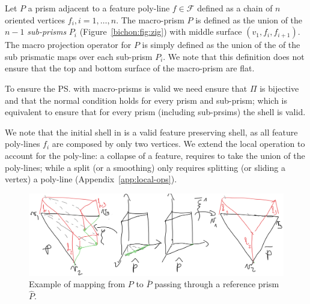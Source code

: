 Let $P$ a prism adjacent to a feature poly-line $f\in\mathcal{F}$ defined as a chain of $n$ oriented vertices $f_i, i=1,\dots,n$. The macro-prism $P$ is defined as the union of the $n-1$ \emph{sub-prisms} $P_i$ (Figure~\ref{bichon:fig:zig}) with middle surface $(v_1, f_i, f_{i+1})$. The macro projection operator for $P$ is simply defined as the union of the of the sub prismatic maps over each sub-prism $P_i$. We note that this definition does not ensure that the top and bottom surface of the macro-prism are flat.


To ensure the \ps{} with macro-prisms is valid we need ensure that $\Pi$ is bijective and that the normal condition holds for every prism and sub-prism; which is equivalent to ensure that for every prism (including sub-prsims) the shell is valid.

We note that the initial shell in \cite{jiang2020bijective} is a valid feature preserving shell, as all feature poly-lines $f_i$ are composed by only two vertices. We extend the local operation to account for the poly-line: a collapse of a feature, requires to take the union of the poly-lines; while a split (or a smoothing) only requires splitting (or sliding a vertex) a poly-line (Appendix~\ref{app:local-ops}).


\begin{figure}
    \centering
    \includegraphics[width=\linewidth]{curve_meshing_in_shell_tex/figs/mappings}
    \caption{Example of mapping from $P$ to $\bar P$ passing through a reference prism $\hat P$.}
    \label{bichon:fig:ref-mapping}
\end{figure}


